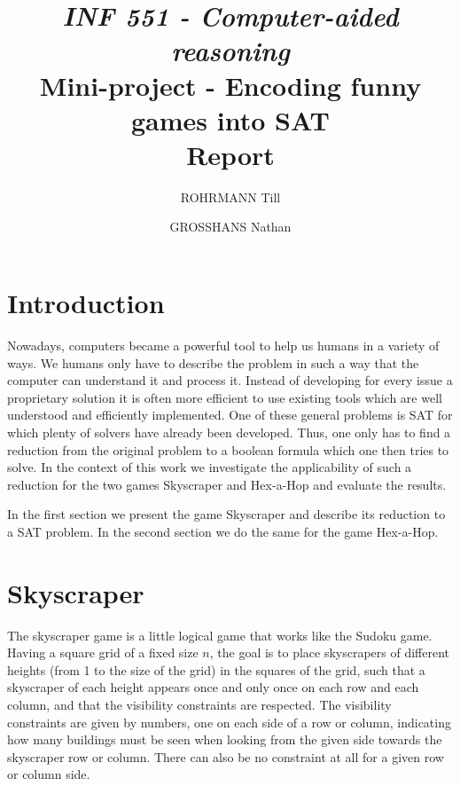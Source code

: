 \documentclass[a4paper, 12pt, titlepage]{article}
\title
{{\em INF 551 - Computer-aided reasoning}\\
Mini-project - Encoding funny games into SAT\\
{\bf Report}}
\author{ROHRMANN Till \and GROSSHANS Nathan}
\date{}
\begin{document}
\maketitle


\section{Introduction}
Nowadays, computers became a powerful tool to help us humans in a variety of ways.
We humans only have to describe the problem in such a way that the computer can understand it and process it.
Instead of developing for every issue a proprietary solution it is often more efficient to use existing tools which are well understood and efficiently implemented.
One of these general problems is SAT for which plenty of solvers have already been developed.
Thus, one only has to find a reduction from the original problem to a boolean formula which one then tries to solve.
In the context of this work we investigate the applicability of such a reduction for the two games Skyscraper and Hex-a-Hop and evaluate the results.

In the first section we present the game Skyscraper and describe its reduction to a SAT problem.
In the second section we do the same for the game Hex-a-Hop.

\section{Skyscraper}
The skyscraper game is a little logical game that works like the Sudoku game.
Having a square grid of a fixed size $n$, the goal is to place skyscrapers of
different heights (from 1 to the size of the grid) in the squares of the grid,
such that a skyscraper of each height appears once and only once on each row and
each column, and that the visibility constraints are respected. The visibility
constraints are given by numbers, one on each side of a row or column,
indicating how many buildings must be seen when looking from the given side
towards the skyscraper row or column. There can also be no constraint at all for
a given row or column side.
\end{document}

